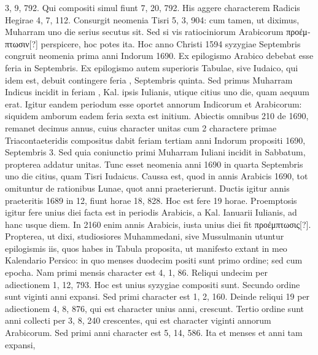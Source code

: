  3, 9, 792. %
Qui compositi
simul fiunt 7, 20, 792.
His aggere characterem Radicis Hegirae
4, 7, 112.
Consurgit neomenia Tisri 5, 3, 904: cum tamen, ut diximus,
Muharram uno die serius secutus sit.
Sed si vis ratiociniorum
Arabicorum \textgreek{προέμπτωσιν[?]} perspicere, hoc potes ita.
Hoc anno Christi
1594 syzygiae Septembris congruit neomenia prima anni Indorum
1690.
%
Ex epilogismo Arabico debebat esse feria 
 in  Septembris.
Ex epilogismo autem superioris Tabulae, sive Iudaico, qui idem
est, debuit contingere feria , Septembris quinta.
Sed primus Muharram
Indicus incidit in feriam , Kal. %
 ipsis Iulianis, utique citius
uno die, quam aequum erat.
Igitur eandem periodum esse oportet
annorum Indicorum et Arabicorum: siquidem amborum
eadem feria sexta est initium.
Abiectis omnibus 210 de 1690, remanet
decimus annus, cuius character unitas cum 2 charactere primae
Triacontaeteridis compositus dabit feriam tertiam anni Indorum
propositi 1690, Septembris 3.
Sed quia coniunctio primi Muharram
Iuliani incidit in Sabbatum, propterea addatur unitas.
Tunc esset
neomenia anni 1690 in quarta Septembris uno die citius, quam Tisri
Iudaicus.
Caussa est, quod in annis Arabicis 1690, tot  omituntur
de rationibus Lunae, quot anni praeterierunt.
Ductis igitur
annis praeteritis 1689 in 12, fiunt horae 18, 828.
Hoc est fere 19
horae.
Proemptosis igitur fere unius diei facta est in periodis Arabicis,
a Kal. %
 Ianuarii Iulianis, ad hanc usque diem.
In 2160 enim annis
Arabicis, iusta unius diei fit \textgreek{προέμπτωσις[?]}.
Propterea, ut dixi, studiosiores
Muhammedani, sive Mussulmanin utuntur epilogismis iis, quos
habes in Tabula proposita, ut manifesto extant in meo Kalendario
Persico: in quo menses duodecim positi sunt primo ordine; sed cum
epocha.
Nam primi mensis character est 4, 1, 86.
Reliqui undecim
per adiectionem 1, 12, 793.
Hoc est unius syzygiae compositi sunt.
Secundo
ordine sunt viginti anni expansi.
Sed primi character est 1, 2,
160.
Deinde reliqui 19 per adiectionem 4, 8, 876, qui est character
unius anni, crescunt.
Tertio ordine sunt anni collecti per 3, 8,
240 crescentes, qui est character viginti annorum Arabicorum.
Sed
primi anni character est 5, 14, 586.
Ita et menses et anni tam expansi,
